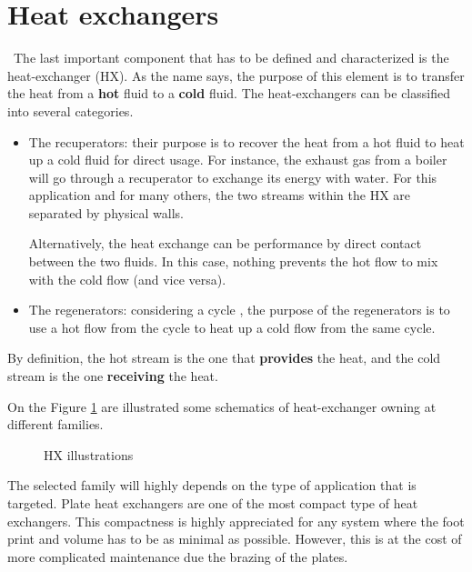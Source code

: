 \section{Heat exchangers}
\quad\, The last important component that has to be defined and characterized is the heat-exchanger (HX). As the name says, the purpose of this element is to transfer the heat from a \textbf{hot} fluid to a \textbf{cold} fluid. The heat-exchangers can be classified into several categories\citep{Ngendakumana2018}.

\begin{itemize}
\item The recuperators: their purpose is to recover the heat from a hot fluid to heat up a cold fluid for direct usage. For instance, the exhaust gas from a boiler will go through a recuperator to exchange its energy with water. For this application and for many others, the two streams within the HX are separated by physical walls.

Alternatively, the heat exchange can be performance by direct contact between the two fluids. In this case, nothing prevents the hot flow to mix with the cold flow (and vice versa).
\item The regenerators: considering a cycle , the purpose of the regenerators is to use a hot flow from the cycle to heat up a cold flow from the same cycle. 
\end{itemize}

By definition, the hot stream is the one that \textbf{provides} the heat, and the cold stream is the one \textbf{receiving} the heat.

On the Figure \ref{fig:C3_HX} are illustrated some schematics of heat-exchanger owning at different families.
\begin{figure}[h]
\centering
{}\hfill
{}\hfill
{}
\caption{HX illustrations} \label{fig:C3_HX}
\end{figure}

The selected family will highly depends on the type of application that is targeted. Plate heat exchangers are one of the most compact type of heat exchangers. This compactness is highly appreciated for any system where the foot print and volume has to be as minimal as possible. However, this is at the cost of more complicated maintenance due the brazing of the plates.

